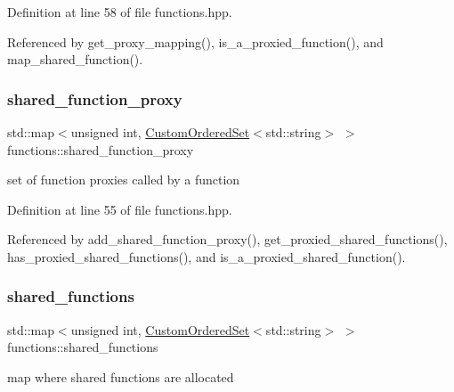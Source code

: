 Definition at line 58 of file functions.\+hpp.



Referenced by get\+\_\+proxy\+\_\+mapping(), is\+\_\+a\+\_\+proxied\+\_\+function(), and map\+\_\+shared\+\_\+function().

\mbox{\label{classfunctions_adb64aa230ffa11fb78fc2a031002b584}} 
\subsubsection{\texorpdfstring{shared\+\_\+function\+\_\+proxy}{shared\_function\_proxy}}
{\footnotesize\ttfamily std\+::map$<$unsigned int, \hyperlink{classCustomOrderedSet}{Custom\+Ordered\+Set}$<$std\+::string$>$ $>$ functions\+::shared\+\_\+function\+\_\+proxy\hspace{0.3cm}{\ttfamily [private]}}



set of function proxies called by a function 



Definition at line 55 of file functions.\+hpp.



Referenced by add\+\_\+shared\+\_\+function\+\_\+proxy(), get\+\_\+proxied\+\_\+shared\+\_\+functions(), has\+\_\+proxied\+\_\+shared\+\_\+functions(), and is\+\_\+a\+\_\+proxied\+\_\+shared\+\_\+function().

\mbox{\label{classfunctions_ad71c1e9d1b6810de5e9a7591e6b3ebb8}} 
\subsubsection{\texorpdfstring{shared\+\_\+functions}{shared\_functions}}
{\footnotesize\ttfamily std\+::map$<$unsigned int, \hyperlink{classCustomOrderedSet}{Custom\+Ordered\+Set}$<$std\+::string$>$ $>$ functions\+::shared\+\_\+functions\hspace{0.3cm}{\ttfamily [private]}}



map where shared functions are allocated 



